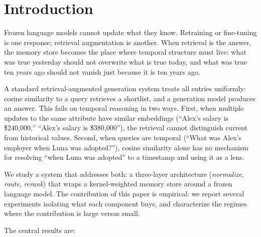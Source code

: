 \documentclass[11pt]{article}
\theoremstyle{plain}
\theoremstyle{definition}
\begin{document}
\section{Introduction}\label{sec:intro}

Frozen language models cannot update what they know.
Retraining or fine-tuning is one response; retrieval
augmentation is another.  When retrieval is the
answer, the memory store becomes the place where
temporal structure must live: what was true yesterday
should not overwrite what is true today, and what was
true ten years ago should not vanish just because it
is ten years ago.

A standard retrieval-augmented generation system treats
all entries uniformly: cosine similarity to a query
retrieves a shortlist, and a generation model produces
an answer.  This fails on temporal reasoning in two
ways.  First, when multiple updates to the same
attribute have similar embeddings (``Alex's salary is
\$240{,}000,'' ``Alex's salary is \$380{,}000''), the
retrieval cannot distinguish current from historical
values.  Second, when queries are temporal
(``What was Alex's employer when Luna was
adopted?''), cosine similarity alone has no mechanism
for resolving ``when Luna was adopted'' to a
timestamp and using it as a lens.

We study a system that addresses both: a three-layer
architecture (\emph{normalize}, \emph{route},
\emph{rerank}) that wraps a kernel-weighted memory
store around a frozen language model.  The contribution
of this paper is empirical: we report several experiments
isolating what each component buys, and characterize
the regimes where the contribution is large versus
small.

The central results are:
\end{document}
